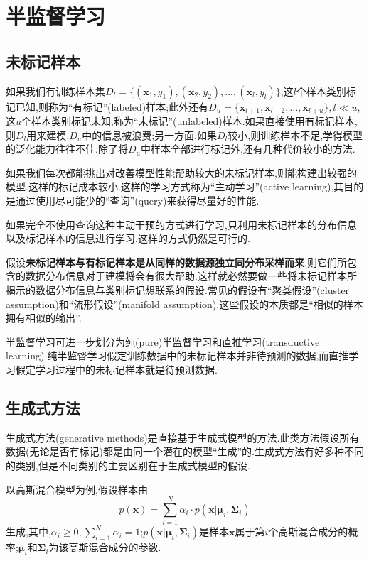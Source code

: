 \chapter{半监督学习}

\section{未标记样本}

如果我们有训练样本集$D_l=\{(\mathbf x_1, y_1),(\mathbf x_2, y_2),\dots,(\mathbf x_l, y_l)\}$,这$l$个样本类别标记已知,则称为``有标记''(labeled)样本;此外还有$D_u=\{\mathbf x_{l+1}, \mathbf x_{l+2}, \dots, \mathbf x_{l+u}\},l\ll u$,这$u$个样本类别标记未知,称为``未标记''(unlabeled)样本.如果直接使用有标记样本,则$D_l$用来建模,$D_u$中的信息被浪费;另一方面,如果$D_l$较小,则训练样本不足,学得模型的泛化能力往往不佳.除了将$D_u$中样本全部进行标记外,还有几种代价较小的方法.

如果我们每次都能挑出对改善模型性能帮助较大的未标记样本,则能构建出较强的模型.这样的标记成本较小.这样的学习方式称为``主动学习''(active learning),其目的是通过使用尽可能少的``查询''(query)来获得尽量好的性能.

如果完全不使用查询这种主动干预的方式进行学习,只利用未标记样本的分布信息以及标记样本的信息进行学习,这样的方式仍然是可行的.

假设\textbf{未标记样本与有标记样本是从同样的数据源独立同分布采样而来},则它们所包含的数据分布信息对于建模将会有很大帮助.这样就必然要做一些将未标记样本所揭示的数据分布信息与类别标记想联系的假设.常见的假设有``聚类假设''(cluster assumption)和``流形假设''(manifold assumption),这些假设的本质都是``相似的样本拥有相似的输出''.

半监督学习可进一步划分为纯(pure)半监督学习和直推学习(transductive learning).纯半监督学习假定训练数据中的未标记样本并非待预测的数据,而直推学习假定学习过程中的未标记样本就是待预测数据.

\section{生成式方法}

生成式方法(generative methods)是直接基于生成式模型的方法.此类方法假设所有数据(无论是否有标记)都是由同一个潜在的模型``生成''的.生成式方法有好多种不同的类别,但是不同类别的主要区别在于生成式模型的假设.

以高斯混合模型为例,假设样本由
\begin{equation}
p(\mathbf x)=\sum_{i=1}^N\alpha_i\cdot p(\mathbf x|\mathbf\mu_i,\mathbf\Sigma_i)
\end{equation}
生成,其中,$\alpha_i\ge 0,\sum_{i=1}^N\alpha_i=1$;$p(\mathbf x|\mathbf\mu_i,\mathbf\Sigma_i)$是样本$\mathbf x$属于第$i$个高斯混合成分的概率;$\mathbf\mu_i$和$\mathbf\Sigma_i$为该高斯混合成分的参数.

